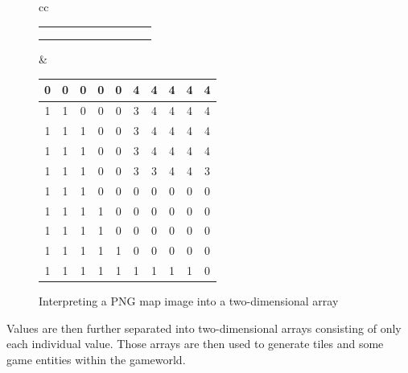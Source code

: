 \begin{figure}[H]
\begin{tabular}{cc}
{\begin{tabular}{|c|c|c|c|c|c|c|c|c|c|}
    \cellcolor{green} & \cellcolor{green} & \cellcolor{green} &
    \cellcolor{green} & \cellcolor{black} & \cellcolor{black} &
    \cellcolor{black} & \cellcolor{black} & \cellcolor{black} &
    \cellcolor{black} \\ \hline
    \cellcolor{green} & \cellcolor{green} & \cellcolor{green} &
    \cellcolor{green} & \cellcolor{black} & \cellcolor{black} &
    \cellcolor{black} & \cellcolor{black} & \cellcolor{black} &
    \cellcolor{black} \\ \hline
    \cellcolor{green} & \cellcolor{green} & \cellcolor{green} &
    \cellcolor{green} & \cellcolor{green} & \cellcolor{black} &
    \cellcolor{black} & \cellcolor{black} & \cellcolor{black} &
    \cellcolor{black} \\ \hline
    \cellcolor{green} & \cellcolor{green} & \cellcolor{green} &
    \cellcolor{green} & \cellcolor{green} & \cellcolor{green} &
    \cellcolor{green} & \cellcolor{green} & \cellcolor{green} &
    \cellcolor{black} \\ \hline
  \end{tabular}
  }
&
  {\footnotesize
\setlength{\tabcolsep}{2.5pt}
  \begin{tabular}{|c|c|c|c|c|c|c|c|c|c|}
    \hline
    0 & 0 & 0 & 0 & 0 & 4 & 4 & 4 & 4 & 4 \\ \hline
    1 & 1 & 0 & 0 & 0 & 3 & 4 & 4 & 4 & 4 \\ \hline
    1 & 1 & 1 & 0 & 0 & 3 & 4 & 4 & 4 & 4 \\ \hline
    1 & 1 & 1 & 0 & 0 & 3 & 4 & 4 & 4 & 4 \\ \hline
    1 & 1 & 1 & 0 & 0 & 3 & 3 & 4 & 4 & 3 \\ \hline
    1 & 1 & 1 & 0 & 0 & 0 & 0 & 0 & 0 & 0 \\ \hline
    1 & 1 & 1 & 1 & 0 & 0 & 0 & 0 & 0 & 0 \\ \hline
    1 & 1 & 1 & 1 & 0 & 0 & 0 & 0 & 0 & 0 \\ \hline
    1 & 1 & 1 & 1 & 1 & 0 & 0 & 0 & 0 & 0 \\ \hline
    1 & 1 & 1 & 1 & 1 & 1 & 1 & 1 & 1 & 0 \\ \hline
  \end{tabular}
  }
\end{tabular}
    \caption{Interpreting a PNG map image into a two-dimensional array}
\end{figure}

Values are then further separated into two-dimensional arrays consisting of
only each individual value.  Those arrays are then used to generate tiles and
some game entities within the gameworld.

